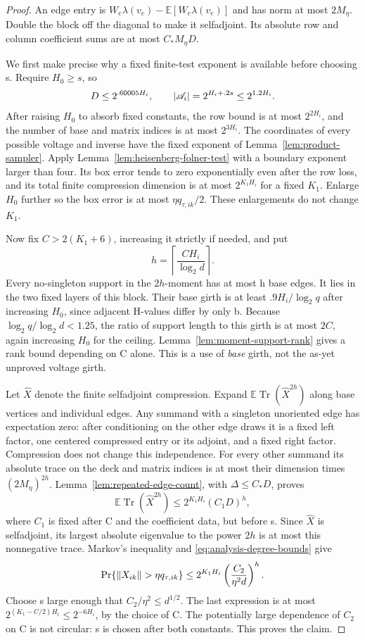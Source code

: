 \begin{proof}
An edge entry is \(W_e\lambda(v_e)-\mathbb E[W_e\lambda(v_e)]\) and has norm
at most \(2M_\eta\).  Double the block off the diagonal to make it
selfadjoint.  Its absolute row and column coefficient sums are at most
\(C_*M_\eta D\).

We first make precise why a fixed finite-test exponent is available before
choosing s.  Require \(H_0\geq s\), so
\[
 D\leq2^{.60005H_i},\qquad
 \left\lvert\mathscr A_i\right\rvert=2^{H_i+.2s}\leq2^{1.2H_i}.
\]
After raising \(H_0\) to absorb fixed constants, the row bound is at most
\(2^{2H_i}\), and the number of base and matrix indices is at most
\(2^{3H_i}\).  The coordinates of every possible voltage and inverse have
the fixed exponent of Lemma~\ref{lem:product-sampler}.  Apply
Lemma~\ref{lem:heisenberg-folner-test} with a boundary exponent larger than
four.  Its box error tends to zero exponentially even after the row loss, and
its total finite compression dimension is at most \(2^{K_1H_i}\) for a fixed
\(K_1\).  Enlarge \(H_0\) further so the box error is at most
\(\eta q_{\tau,ik}/2\).  These enlargements do not change \(K_1\).

Now fix \(C>2(K_1+6)\), increasing it strictly if needed, and put
\[
 h=\left\lceil\frac{CH_i}{\log_2d}\right\rceil.
\]
Every no-singleton support in the \(2h\)-moment has at most h base edges.
It lies in the two fixed layers of this block.  Their base girth is at least
\(.9H_i/\log_2q\) after increasing \(H_0\), since adjacent H-values differ
by only b.  Because \(\log_2q/\log_2d<1.25\), the ratio of support length
to this girth is at most \(2C\), again increasing \(H_0\) for the ceiling.
Lemma~\ref{lem:moment-support-rank} gives a rank bound depending on C alone.
This is a use of \emph{base} girth, not the as-yet unproved voltage girth.

Let \(\widehat X\) denote the finite selfadjoint compression.  Expand
\(\mathbb E\operatorname{Tr}(\widehat X^{2h})\) along base vertices and
individual edges.  Any summand with a singleton unoriented edge has expectation
zero: after conditioning on the other edge draws it is a fixed left factor,
one centered compressed entry or its adjoint, and a fixed right factor.
Compression does not change this independence.  For every other summand its
absolute trace on the deck and matrix indices is at most their dimension
times \((2M_\eta)^{2h}\).  Lemma~\ref{lem:repeated-edge-count}, with
\(\Delta\leq C_*D\), proves
\[
 \mathbb E\operatorname{Tr}(\widehat X^{2h})
 \leq2^{K_1H_i}(C_1D)^h,
\]
where \(C_1\) is fixed after C and the coefficient data, but before s.
Since \(\widehat X\) is selfadjoint, its largest absolute eigenvalue to the
power \(2h\) is at most this nonnegative trace.  Markov's inequality and
\eqref{eq:analysis-degree-bounds} give
\[
 \Pr\{\left\lVert X_{ik}\right\rVert>\eta q_{\tau,ik}\}
 \leq2^{K_1H_i}\left(\frac{C_2}{\eta^2d}\right)^h.
\]
Choose s large enough that \(C_2/\eta^2\leq d^{1/2}\).  The last expression
is at most \(2^{(K_1-C/2)H_i}\leq2^{-6H_i}\), by the choice of C.
The potentially large dependence of \(C_2\) on C is not circular: s is
chosen after both constants.  This proves the claim.
\end{proof}

